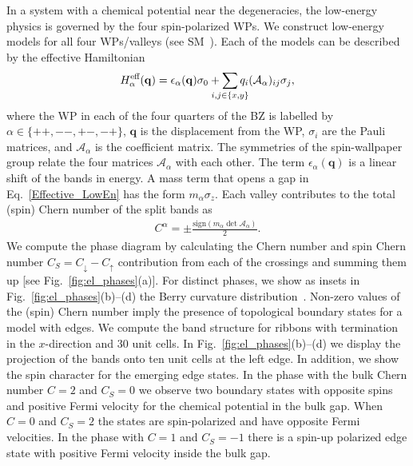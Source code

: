 \documentclass[aps,prb,twocolumn,amsmath,amssymb,floatfix]{revtex4-2}
\begin{document}
In a system with a chemical potential near the degeneracies, the low-energy physics is governed by the four spin-polarized WPs. 
We construct low-energy models for all four WPs/valleys (see SM~\cite{sm_note}). Each of the models can be described by the effective Hamiltonian
\begin{equation}\label{Effective_LowEn}
    H^{\text{eff}}_{\alpha}(\mathbf{q}) = \epsilon_{\alpha}(\mathbf{q}) \sigma_0 + \sum_{\mathclap{i,j\in\{x,y\}}} q_i (\mathcal{A}_{\alpha})_{ij}\sigma_j,
\end{equation}
where the WP in each of the four quarters of the BZ is labelled by $\alpha \in \{++,--,+-,-+\}$, 
$\mathbf{q}$ is the displacement from the WP, 
$\sigma_i$ are the Pauli matrices, 
and $\mathcal{A}_{\alpha}$ is the coefficient matrix. The symmetries of the spin-wallpaper group relate the four matrices $\mathcal{A}_{\alpha}$ with each other. The term $\epsilon_{\alpha}(\mathbf{q})$ is a linear shift of the bands in energy.
A mass term that opens a gap in Eq.~\eqref{Effective_LowEn} has the form $m_{\alpha}\sigma_z$. 
Each valley contributes to the total (spin) Chern number of the split bands as
\begin{align}
    C^{\alpha} = \pm \tfrac{\text{sign} (m_{\alpha}\det \mathcal{A}_{\alpha})}{2}.\label{Chern_num}
\end{align}
We compute the phase diagram by calculating the Chern number and spin Chern number $C_S = C_{\downarrow} - C_{\uparrow}$ contribution from each of the crossings and summing them up [see Fig.~\ref{fig:el_phases}(a)]. For distinct phases, we show as insets in Fig.~\ref{fig:el_phases}(b)--(d) the Berry curvature distribution~\cite{PhysRevLett.117.052001}. Non-zero values of the (spin) Chern number imply the presence of topological boundary states for a model with edges. 
We compute the band structure for ribbons with termination in the $x$-direction and 30 unit cells. 
In Fig.~\ref{fig:el_phases}(b)--(d) we display the projection of the bands onto ten unit cells at the left edge. In addition, we show the spin character for the emerging edge states. In the phase with the bulk Chern number $C=2$ and $C_S=0$ we observe two boundary states with opposite spins and positive Fermi velocity for the chemical potential in the bulk gap. When $C=0$ and $C_S=2$ the states are spin-polarized and have opposite Fermi velocities. In the phase with $C=1$ and $C_S=-1$ there is a spin-up polarized edge state with positive Fermi velocity inside the bulk gap.
\end{document}
